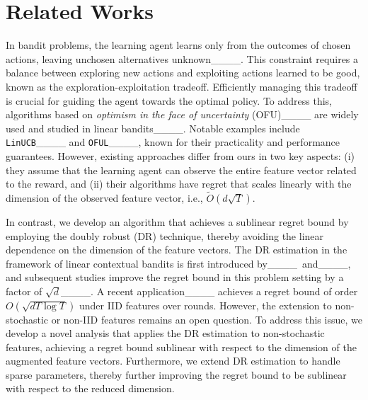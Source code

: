 \section{Related Works}
\label{sec:related_works}
In bandit problems, the learning agent learns only from the outcomes of chosen actions, leaving unchosen alternatives unknown____. 
This constraint requires a balance between exploring new actions and exploiting actions learned to be good, known as the exploration-exploitation tradeoff. 
Efficiently managing this tradeoff is crucial for guiding the agent towards the optimal policy.
To address this, algorithms based on \textit{optimism in the face of uncertainty} (OFU)____ are widely used and studied in linear bandits____. 
Notable examples include \texttt{LinUCB}____ and \texttt{OFUL}____, known for their practicality and performance guarantees. 
However, existing approaches differ from ours in two key aspects: (i) they assume that the learning agent can observe the entire feature vector related to the reward, and (ii) their algorithms have regret that scales linearly with the dimension of the observed feature vector, i.e., $\tilde{O}(d\sqrt{T})$. 

In contrast, we develop an algorithm that achieves a sublinear regret bound by employing the doubly robust (DR) technique, thereby avoiding the linear dependence on the dimension of the feature vectors.
The DR estimation in the framework of linear contextual bandits is first introduced by____~and____, and subsequent studies improve the regret bound in this problem setting by a factor of $\sqrt{d}$____.
A recent application____ achieves a regret bound of order $O(\sqrt{dT\log T})$ under IID features over rounds.
However, the extension to non-stochastic or non-IID features remains an open question.
To address this issue, we develop a novel analysis that applies the DR estimation to non-stochastic features, achieving a regret bound sublinear with respect to the dimension of the augmented feature vectors. 
Furthermore, we extend DR estimation to handle sparse parameters, thereby further improving the regret bound to be sublinear with respect to the reduced dimension.

